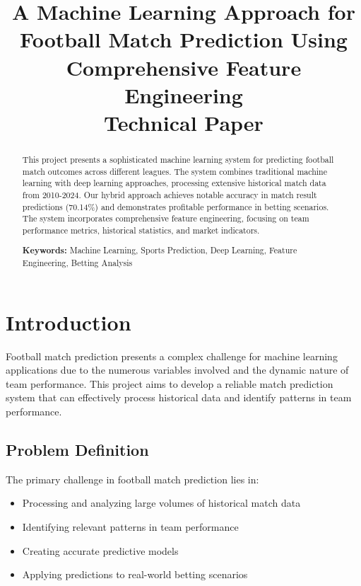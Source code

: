 \documentclass[conference]{IEEEtran}
\begin{document}
\title{A Machine Learning Approach for Football Match Prediction Using Comprehensive Feature Engineering\\
\large{Technical Paper}}

\author{
}

\maketitle

\begin{abstract}
This project presents a sophisticated machine learning system for predicting football match outcomes across different leagues. The system combines traditional machine learning with deep learning approaches, processing extensive historical match data from 2010-2024. Our hybrid approach achieves notable accuracy in match result predictions (70.14\%) and demonstrates profitable performance in betting scenarios. The system incorporates comprehensive feature engineering, focusing on team performance metrics, historical statistics, and market indicators.

\textbf{Keywords:} Machine Learning, Sports Prediction, Deep Learning, Feature Engineering, Betting Analysis
\end{abstract}

\section{Introduction}
Football match prediction presents a complex challenge for machine learning applications due to the numerous variables involved and the dynamic nature of team performance. This project aims to develop a reliable match prediction system that can effectively process historical data and identify patterns in team performance.

\subsection{Problem Definition}
The primary challenge in football match prediction lies in:
\begin{itemize}
    \item Processing and analyzing large volumes of historical match data
    \item Identifying relevant patterns in team performance
    \item Creating accurate predictive models
    \item Applying predictions to real-world betting scenarios
\end{itemize}
\end{document}
